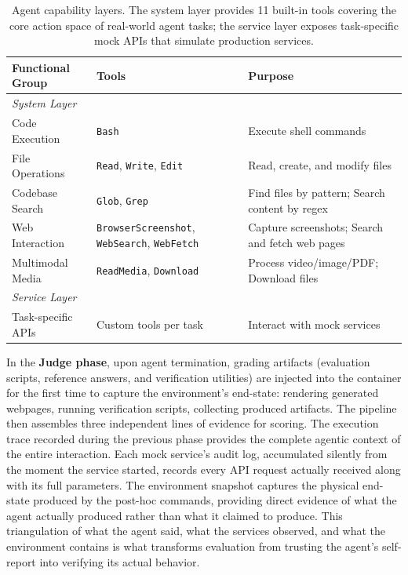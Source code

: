 \documentclass{article}
\begin{document}
\begin{table}[t]
  \centering
  \caption{Agent capability layers. The system layer provides 11 built-in tools covering the core action space of real-world agent tasks; the service layer exposes task-specific mock APIs that simulate production services.}
  \label{tab:tools}
  \scriptsize
  \renewcommand{\arraystretch}{1.05}
  \begin{tabular}{@{}l|l|l@{}}
  \toprule
  \textbf{Functional Group} & \textbf{Tools} & \textbf{Purpose} \\
  \midrule
  \multicolumn{3}{l}{\emph{System Layer}} \\
  \midrule
 
  Code Execution       & \texttt{Bash}                                          & Execute shell commands \\
  File Operations      & \texttt{Read}, \texttt{Write}, \texttt{Edit}           & Read, create, and modify files \\
  
  Codebase Search      & \texttt{Glob}, \texttt{Grep}                           & Find files by pattern; Search content by regex \\
  Web Interaction      & \texttt{BrowserScreenshot}, \texttt{WebSearch}, \texttt{WebFetch} & Capture screenshots; Search and fetch web pages \\
  
  Multimodal Media     & \texttt{ReadMedia}, \texttt{Download}                  & Process video/image/PDF; Download files \\
  \midrule
  \multicolumn{3}{l}{\emph{Service Layer}} \\
  \midrule
 
  Task-specific APIs   & Custom tools per task                                  & Interact with mock services \\
  \bottomrule
  \end{tabular}
\end{table}

In the \textbf{Judge phase}, upon agent termination, grading artifacts (evaluation scripts, reference answers, and verification utilities) are injected into the container for the first time to capture the environment's end-state: rendering generated webpages, running verification scripts, collecting produced artifacts. The pipeline then assembles three independent lines of evidence for scoring. The execution trace recorded during the previous phase provides the complete agentic context of the entire interaction. Each mock service's audit log, accumulated silently from the moment the service started, records every API request actually received along with its full parameters. The environment snapshot captures the physical end-state produced by the post-hoc commands, providing direct evidence of what the agent actually produced rather than what it claimed to produce. This triangulation of what the agent said, what the services observed, and what the environment contains is what transforms evaluation from trusting the agent's self-report into verifying its actual behavior.
\end{document}
